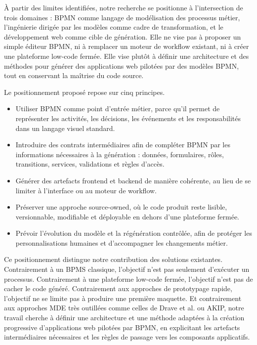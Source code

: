 
À partir des limites identifiées, notre recherche se positionne à
l'intersection de trois domaines : BPMN comme langage de modélisation
des processus métier, l'ingénierie dirigée par les modèles comme cadre
de transformation, et le développement web comme cible de génération.
Elle ne vise pas à proposer un simple éditeur BPMN, ni à remplacer un
moteur de workflow existant, ni à créer une plateforme low-code fermée.
Elle vise plutôt à définir une architecture et des méthodes pour générer
des applications web pilotées par des modèles BPMN, tout en conservant
la maîtrise du code source.

Le positionnement proposé repose sur cinq principes.

\begin{itemize}
\item
  Utiliser BPMN comme point d'entrée métier, parce qu'il permet de
  représenter les activités, les décisions, les événements et les
  responsabilités dans un langage visuel standard.
\item
  Introduire des contrats intermédiaires afin de compléter BPMN par les
  informations nécessaires à la génération : données, formulaires,
  rôles, transitions, services, validations et règles d'accès.
\item
  Générer des artefacts frontend et backend de manière cohérente, au
  lieu de se limiter à l'interface ou au moteur de workflow.
\item
  Préserver une approche source-owned, où le code produit reste lisible,
  versionnable, modifiable et déployable en dehors d'une plateforme
  fermée.
\item
  Prévoir l'évolution du modèle et la régénération contrôlée, afin de
  protéger les personnalisations humaines et d'accompagner les
  changements métier.
\end{itemize}

Ce positionnement distingue notre contribution des solutions existantes.
Contrairement à un BPMS classique, l'objectif n'est pas seulement
d'exécuter un processus. Contrairement à une plateforme low-code fermée,
l'objectif n'est pas de cacher le code généré. Contrairement aux
approches de prototypage rapide, l'objectif ne se limite pas à produire
une première maquette. Et contrairement aux approches MDE très outillées
comme celles de Drave et al. ou AKIP, notre travail cherche à définir
une architecture et une méthode adaptées à la création progressive
d'applications web pilotées par BPMN, en explicitant les artefacts
intermédiaires nécessaires et les règles de passage vers les composants
applicatifs.

